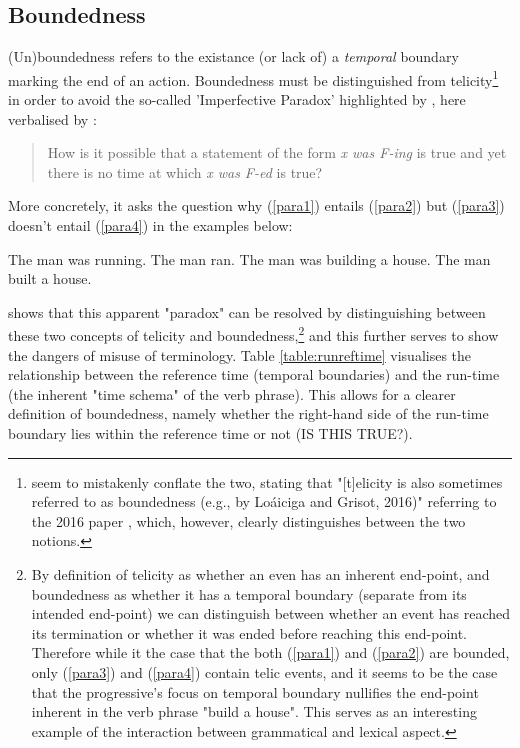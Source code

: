 \subsection*{Boundedness}
(Un)boundedness refers to the existance (or lack of) a \emph{temporal} boundary marking the end of an action. Boundedness must be distinguished from telicity\footnote{\citet{friedrich-etal-2023-kind} seem to mistakenly conflate the two, stating that "[t]elicity is also sometimes referred to as boundedness (e.g., by Loáiciga and Grisot, 2016)" referring to the 2016 paper \citet{loaiciga-grisot-2016-predicting}, which, however, clearly distinguishes between the two notions.} in order to avoid the so-called 'Imperfective Paradox' highlighted by \citet{Linguistics2005DowtyD1}, here verbalised by \citet{zucchi}:

\begin{quotation}
    How is it possible that a statement of the form \emph{x was F-ing} is true and yet there
    is no time at which \emph{x was F-ed} is true?
\end{quotation}
More concretely, it asks the question why (\ref{para1}) entails (\ref{para2}) but (\ref{para3}) doesn't entail (\ref{para4}) in the examples below:
\begin{exe}
    \ex The man was running.
    \label{para1}
    \ex The man ran.
    \label{para2}
    \ex The man was building a house.
    \label{para3}
    \ex The man built a house.
    \label{para4}
\end{exe}
\citet{6608d9d0-a477-39af-8491-2172df5ae612} shows that this apparent "paradox" can be resolved by distinguishing between these two concepts of telicity and boundedness,\footnote{By definition of telicity as whether an even has an inherent end-point, and boundedness as whether it has a temporal boundary (separate from its intended end-point) we can distinguish between whether an event has reached its termination or whether it was ended before reaching this end-point. Therefore while it the case that the both (\ref{para1}) and (\ref{para2}) are bounded, only (\ref{para3}) and (\ref{para4}) contain telic events, and it seems to be the case that the progressive's focus on temporal boundary nullifies the end-point inherent in the verb phrase "build a house". This serves as an interesting example of the interaction between grammatical and lexical aspect.} and this further serves to show the dangers of misuse of terminology. Table \ref{table:runreftime} visualises the relationship between the reference time (temporal boundaries) and the run-time (the inherent "time schema" of the verb phrase). This allows for a clearer definition of boundedness, namely whether the right-hand side of the run-time boundary lies within the reference time or not (IS THIS TRUE?).


